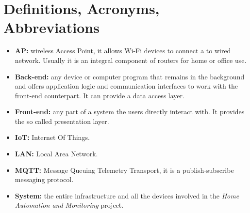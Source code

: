 \section{Definitions, Acronyms, Abbreviations}

\begin{itemize}
	\item \textbf{AP:} wireless Access Point, it allows Wi-Fi devices to connect a to wired network. Usually it is an integral component of routers for home or office use.
	\item \textbf{Back-end:} any device or computer program that remains in the background and offers application logic and communication interfaces to work with the front-end counterpart. It can provide a data access layer.
	\item \textbf{Front-end:} any part of a system the users directly interact with. It provides the so called presentation layer.
	\item \textbf{IoT:} Internet Of Things.
	\item \textbf{LAN:} Local Area Network.
	\item \textbf{MQTT:} Message Queuing Telemetry Transport, it is a publish-subscribe messaging protocol.
	\item \textbf{System:} the entire infrastructure and all the devices involved in the \textit{Home Automation and Monitoring} project.
\end{itemize}